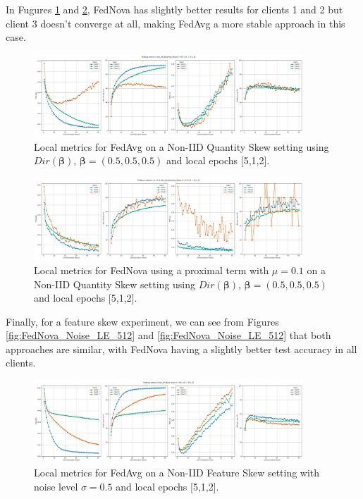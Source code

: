 In Fugures \ref{fig:FedAvg_QuantitySkew_LE_512} and \ref{fig:FedNova_QuantitySkew_LE_512}, FedNova has slightly better results for clients 1 and 2 but client 3 doesn't converge at all, making FedAvg a more stable approach in this case.

\begin{figure}[H]
  \centering
  \includegraphics[width=0.9\textwidth]{figures/2-Federated_Learning/FedAvg_QuantitySkew_LE_512.png}
  \caption{Local metrics for FedAvg  on a Non-IID Quantity Skew setting using $Dir(\boldsymbol{\beta})$, $\boldsymbol{\beta}=(0.5, 0.5, 0.5)$ and local epochs [5,1,2].}
  \label{fig:FedAvg_QuantitySkew_LE_512}
\end{figure}


\begin{figure}[H]
  \centering
  \includegraphics[width=0.9\textwidth]{figures/2-Federated_Learning/FedNova_QuantitySkew_LE_512.png}
  \caption{Local metrics for FedNova using a proximal term with $\mu=0.1$ on a Non-IID Quantity Skew setting using $Dir(\boldsymbol{\beta})$, $\boldsymbol{\beta}=(0.5,0.5,0.5)$ and local epochs [5,1,2].}
  \label{fig:FedNova_QuantitySkew_LE_512}
\end{figure}

Finally, for a feature skew experiment, we can see from Figures \ref{fig:FedNova_Noise_LE_512} and \ref{fig:FedNova_Noise_LE_512} that both approaches are similar, with FedNova having a slightly better test accuracy in all clients.
\begin{figure}[H]
  \centering
  \includegraphics[width=0.9\textwidth]{figures/2-Federated_Learning/FedAvg_Noise_LE_512.png}
  \caption{Local metrics for FedAvg  on a Non-IID Feature Skew setting with noise level $\sigma=0.5$  and local epochs [5,1,2].}
  \label{fig:FedAvg_Noise_LE_512}
\end{figure}


